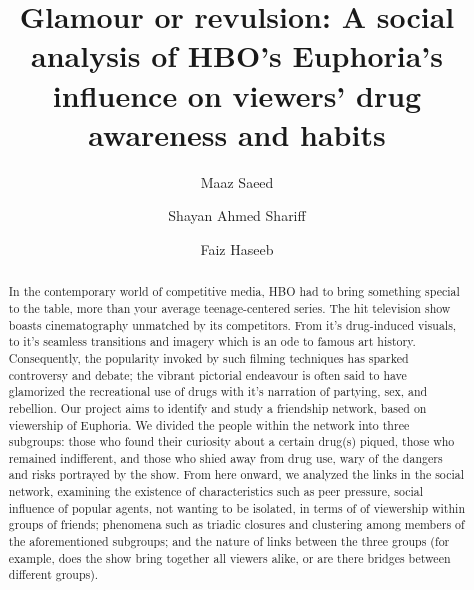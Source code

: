 \documentclass[runningheads]{llncs}
\begin{document}
%
\title{Glamour or revulsion: A social analysis of HBO's Euphoria's influence on viewers' drug awareness and habits}%
%
%
\author{Maaz Saeed \and
Shayan Ahmed Shariff \and
Faiz Haseeb}
%
%
%
\maketitle              %
%
\begin{abstract}
In the contemporary world of competitive media, HBO had to bring something special to the table, more
than your average teenage-centered series. The hit television show boasts cinematography unmatched by
its competitors. From it’s drug-induced visuals, to it’s seamless transitions and imagery which is an ode to
famous art history. Consequently, the popularity invoked by such filming techniques has sparked
controversy and debate; the vibrant pictorial endeavour is often said to have glamorized the recreational
use of drugs with it’s narration of partying, sex, and rebellion. Our project aims to identify and study a friendship network, based on viewership of Euphoria. We
divided the people within the network into three subgroups: those who found their curiosity about a certain
drug(s) piqued, those who remained indifferent, and those who shied away from drug use, wary of the
dangers and risks portrayed by the show. From here onward, we analyzed the links in the
social network, examining the existence of characteristics such as peer pressure, social influence of popular
agents, not wanting to be isolated, in terms of of viewership within groups of friends;
phenomena such as triadic closures and clustering among members of the aforementioned subgroups; and
the nature of links between the three groups (for example, does the show bring together all viewers alike, or
are there bridges between different groups).

\end{abstract}
%
%
%
\newpage
\end{document}
